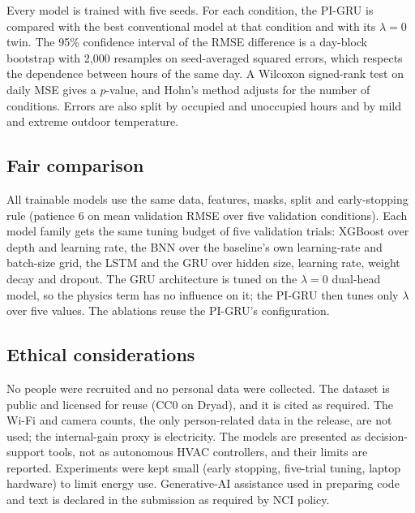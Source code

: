 Every model is trained with five seeds. For each condition, the PI-GRU is compared with the best conventional model at that condition and with its $\lambda=0$ twin. The 95\% confidence interval of the RMSE difference is a day-block bootstrap \citep{kunsch1989bootstrap} with 2{,}000 resamples on seed-averaged squared errors, which respects the dependence between hours of the same day. A Wilcoxon signed-rank test on daily MSE gives a $p$-value, and Holm's method \citep{holm1979simple} adjusts for the number of conditions. Errors are also split by occupied and unoccupied hours and by mild and extreme outdoor temperature.

\subsection{Fair comparison}
All trainable models use the same data, features, masks, split and early-stopping rule (patience 6 on mean validation RMSE over five validation conditions). Each model family gets the same tuning budget of five validation trials: XGBoost over depth and learning rate, the BNN over the baseline's own learning-rate and batch-size grid, the LSTM and the GRU over hidden size, learning rate, weight decay and dropout. The GRU architecture is tuned on the $\lambda=0$ dual-head model, so the physics term has no influence on it; the PI-GRU then tunes only $\lambda$ over five values. The ablations reuse the PI-GRU's configuration.

\subsection{Ethical considerations}
No people were recruited and no personal data were collected. The dataset is public and licensed for reuse (CC0 on Dryad), and it is cited as required. The Wi-Fi and camera counts, the only person-related data in the release, are not used; the internal-gain proxy is electricity. The models are presented as decision-support tools, not as autonomous HVAC controllers, and their limits are reported. Experiments were kept small (early stopping, five-trial tuning, laptop hardware) to limit energy use. Generative-AI assistance used in preparing code and text is declared in the submission as required by NCI policy.
